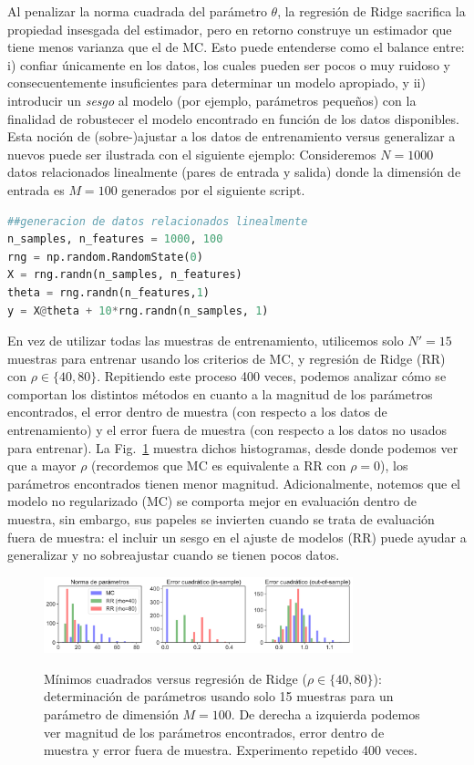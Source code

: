 Al penalizar la norma cuadrada del parámetro $\theta$, la regresión de Ridge sacrifica la propiedad insesgada del estimador, pero en retorno construye un estimador que tiene menos varianza que el de MC. Esto puede entenderse como el balance entre: i) confiar únicamente en los datos, los cuales pueden ser pocos o muy ruidoso y consecuentemente insuficientes para determinar un modelo apropiado, y ii) introducir un \emph{sesgo} al modelo (por ejemplo, parámetros pequeños) con la finalidad de robustecer el modelo encontrado en función de los datos disponibles. Esta noción de (sobre-)ajustar a los datos de entrenamiento versus generalizar a  nuevos  puede ser ilustrada con el siguiente ejemplo: Consideremos $N=1000$ datos relacionados linealmente (pares de entrada y salida) donde la dimensión de entrada es $M=100$ generados por el siguiente script.
\begin{lstlisting}[language=Python]
##generacion de datos relacionados linealmente 
n_samples, n_features = 1000, 100
rng = np.random.RandomState(0)
X = rng.randn(n_samples, n_features)
theta = rng.randn(n_features,1)
y = X@theta + 10*rng.randn(n_samples, 1)
\end{lstlisting}
 En vez de utilizar todas las muestras de entrenamiento, utilicemos solo $N'=15$ muestras para entrenar usando los criterios de MC, y regresión de Ridge (RR) con $\rho\in\{40,80\}$. Repitiendo este proceso 400 veces, podemos analizar cómo se comportan los distintos métodos en cuanto a la magnitud de los parámetros encontrados, el error dentro de muestra (con respecto a los datos de entrenamiento) y el error fuera de muestra (con respecto a los datos no usados para entrenar). La Fig.~\ref{fig:MCvsRR_Synth} muestra dichos histogramas, desde donde podemos ver que a mayor $\rho$ (recordemos que MC es equivalente a RR con $\rho=0$), los parámetros encontrados tienen menor magnitud. Adicionalmente, notemos que el modelo no regularizado (MC) se comporta mejor en evaluación dentro de muestra, sin embargo, sus papeles se invierten cuando se trata de evaluación fuera de muestra: el incluir un sesgo en el ajuste de modelos (RR) puede ayudar a generalizar y no sobreajustar cuando se tienen pocos datos. 

 \begin{figure}[H]
	\centering
	\includegraphics[width=0.8\textwidth]{img/cap1_bias-variance.pdf}\\
	\caption{Mínimos cuadrados versus regresión de Ridge ($\rho\in\{40,80\}$): determinación de parámetros usando solo 15 muestras para un parámetro de dimensión $M=100$. De derecha a izquierda podemos ver magnitud de los parámetros encontrados, error dentro de muestra y error fuera de muestra. Experimento repetido 400 veces.}
	\label{fig:MCvsRR_Synth}  
\end{figure}



